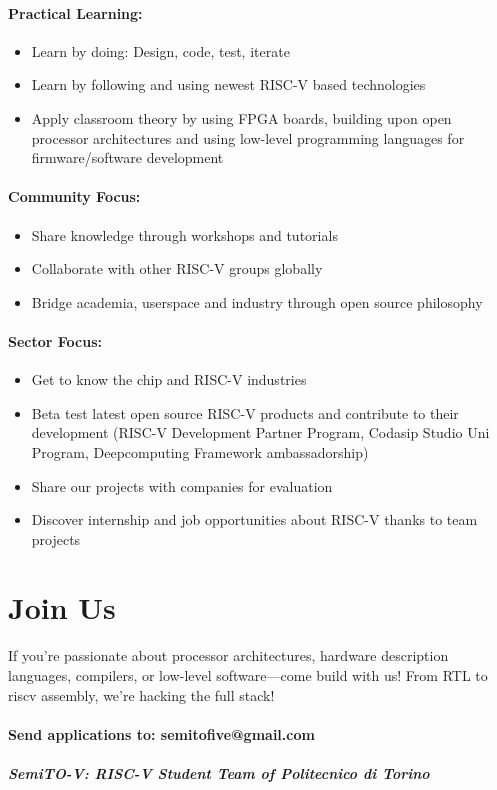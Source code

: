\documentclass{article}
\begin{document}
\paragraph{Practical Learning:}

\begin{itemize}
    \item Learn by doing: Design, code, test, iterate
    \item Learn by following and using newest RISC-V based technologies
    \item Apply classroom theory by using FPGA boards, building upon open processor architectures and using low-level programming languages for firmware/software development
\end{itemize}

\paragraph{Community Focus:}

\begin{itemize}
    \item Share knowledge through workshops and tutorials
    \item Collaborate with other RISC-V groups globally
    \item Bridge academia, userspace and industry through open source philosophy
\end{itemize}

\paragraph{Sector Focus:}

\begin{itemize}
    \item Get to know the chip and RISC-V industries
    \item Beta test latest open source RISC-V products and contribute to their development (RISC-V Development Partner Program, Codasip Studio Uni Program, Deepcomputing Framework ambassadorship)
    \item Share our projects with companies for evaluation
    \item Discover internship and job opportunities about RISC-V thanks to team projects
\end{itemize}

\section{Join Us}

If you're passionate about processor architectures, hardware description languages, compilers, or low-level software—come build with us! From RTL to riscv assembly, we're hacking the full stack!

\paragraph{Send applications to: semitofive@gmail.com}

\subparagraph{\textit{SemiTO-V: RISC-V Student Team of Politecnico di Torino}}
\end{document}
